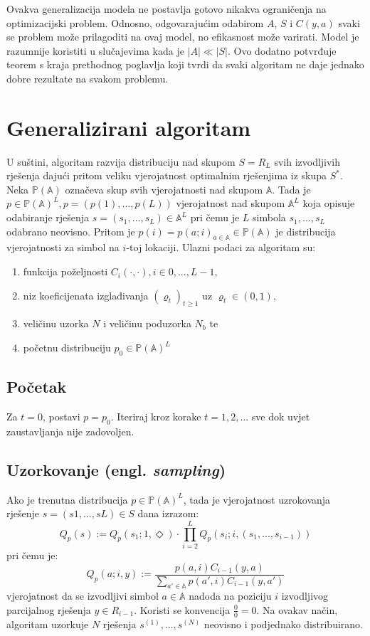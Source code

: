 \documentclass[times, utf8, zavrsni]{fer}
\begin{document}
Ovakva generalizacija modela ne postavlja gotovo nikakva ograničenja na optimizacijski problem. Odnosno, odgovarajućim odabirom
$A$, $S$ i $C(y, a)$ svaki se problem može prilagoditi na ovaj model, no efikasnost može varirati. Model je razumnije koristiti u slučajevima kada je $|A| \ll |S|$. Ovo dodatno potvrđuje teorem s kraja prethodnog poglavlja koji tvrdi da svaki algoritam ne daje jednako dobre rezultate na svakom problemu.



\section{Generalizirani algoritam}
U suštini, algoritam razvija distribuciju nad skupom $S=R_L$ svih izvodljivih rješenja dajući pritom veliku vjerojatnost optimalnim rješenjima iz skupa $S^*$.
Neka $\mathbb{P}(\mathbb{A})$ označeva skup svih vjerojatnosti nad skupom $\mathbb{A}$. Tada je $p \in \mathbb{P}(\mathbb{A})^L, p = (p(1), . . . , p(L))$ vjerojatnost nad skupom $\mathbb{A}^L$ koja opisuje odabiranje rješenja
$s = (s_1,...,s_L) \in \mathbb{A}^L$ pri čemu je $L$ simbola $s_1,...,s_L$ odabrano neovisno. Pritom je
$p(i) = p(a;i)_{a \in \mathbb{A}} \in \mathbb{P}(\mathbb{A})$ je distribucija vjerojatnosti za simbol na $i$-toj lokaciji.
Ulazni podaci za algoritam su:
\begin{enumerate}
  \item funkcija poželjnosti $C_i(\cdot, \cdot), i \in {0,..., L-1}$,
  \item niz koeficijenata izglađivanja $(\varrho_t)_{t \geq 1}$ uz $\varrho_t \in (0, 1)$,
  \item veličinu uzorka $N$ i veličinu poduzorka $N_b$ te
  \item početnu distribuciju $p_0 \in \mathbb{P}(\mathbb{A})^L$
\end{enumerate}

\subsection{Početak}
Za $t = 0$, postavi $p = p_0$. Iteriraj kroz korake $t = 1, 2,...$ sve dok uvjet zaustavljanja nije zadovoljen.

\subsection{Uzorkovanje (engl. \textit{sampling})}
Ako je trenutna distribucija $p \in \mathbb{P}(\mathbb{A})^L$, tada je vjerojatnost uzrokovanja rješenje $s = (s1,...,sL) \in S$ dana izrazom:
$$
Q_p(s) := Q_p(s_1; 1, \Diamond) \cdot \prod^L_{i=2} Q_p(s_i;i, (s_1,...,s_{i-1}))
$$
pri čemu je:
$$
Q_p(a;i, y) := \frac{p(a, i)C_{i-1}(y, a)}{\sum_{a' \in \mathbb{A}} p(a', i)C_{i-1}(y, a') }
$$
vjerojatnost da se izvodljivi simbol $a \in \mathbb{A}$ nadoda na poziciju $i$ izvodljivog parcijalnog rješenja $y \in R_{i-1}$. Koristi se konvencija $\frac{0}{0} = 0$.
Na ovakav način, algoritam uzorkuje $N$ rješenja $s^{(1)},...,s^{(N)}$ neovisno i podjednako distribuirano.
\end{document}
